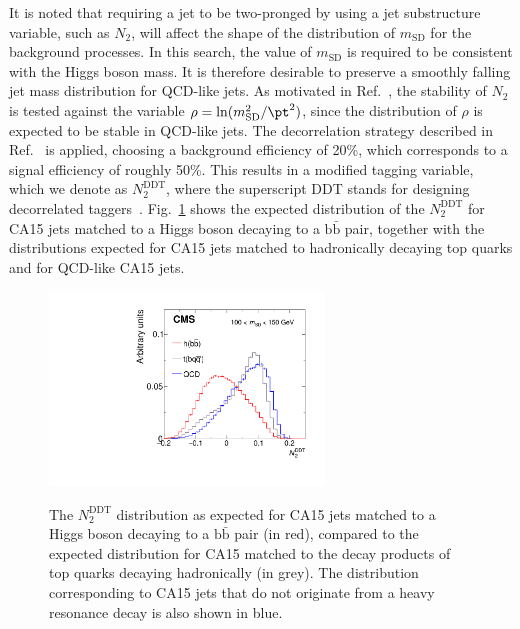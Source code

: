 It is noted that requiring a jet to be two-pronged by using a jet substructure variable,
such as $N_2$, will affect the shape of the distribution of $m_\text{SD}$ for the
background processes. In this search, the value of $m_\text{SD}$ is required to be consistent with the Higgs boson mass.
It is therefore desirable to preserve a smoothly falling jet mass
distribution for QCD-like jets. 
As motivated in Ref.~\cite{ddt}, the stability of $N_2$ is tested against the variable
$\rho=\ln(m_{\text{SD}}^2/\pt^2)$, since the distribution of $\rho$ is expected to be stable in QCD-like jets.
The decorrelation strategy described in Ref.~\cite{ddt} is applied,
choosing a background efficiency of 20\%, which corresponds to a
signal efficiency of roughly 50\%. This results in a modified tagging
variable, which we denote as $N_2^\text{DDT}$, where the superscript DDT stands for designing decorrelated taggers~\cite{ddt}. Fig.~\ref{n2ddt} shows the expected distribution of the $N_2^\text{DDT}$ for CA15 jets matched to a Higgs boson decaying to a $\mathrm{b\bar{b}}$ pair, together with the distributions expected for CA15 jets matched to hadronically decaying top quarks and for QCD-like CA15 jets.
\begin{figure}
\centering
  \includegraphics[width=0.65\textwidth]{figures/ddt_N2DDT_ns.pdf} \\
\caption{The $N_2^\text{DDT}$ distribution as expected for CA15 jets matched to a Higgs boson decaying to a $\mathrm{b\bar{b}}$ pair (in red), compared to the expected distribution for CA15 matched to the decay products of top quarks decaying hadronically (in grey). The distribution corresponding to CA15 jets that do not originate from a heavy resonance decay is also shown in blue.}
\label{n2ddt}
\end{figure}


